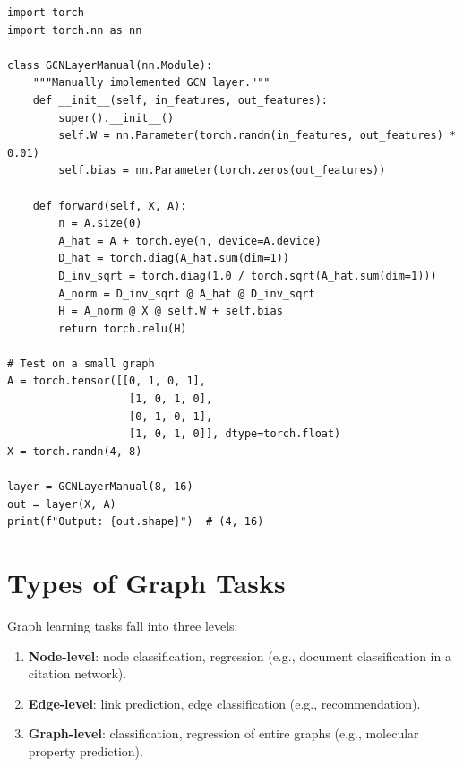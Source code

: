 \begin{codeblock}[title=\textbf{GCN implemented from scratch}]
\begin{verbatim}
import torch
import torch.nn as nn

class GCNLayerManual(nn.Module):
    """Manually implemented GCN layer."""
    def __init__(self, in_features, out_features):
        super().__init__()
        self.W = nn.Parameter(torch.randn(in_features, out_features) * 0.01)
        self.bias = nn.Parameter(torch.zeros(out_features))

    def forward(self, X, A):
        n = A.size(0)
        A_hat = A + torch.eye(n, device=A.device)
        D_hat = torch.diag(A_hat.sum(dim=1))
        D_inv_sqrt = torch.diag(1.0 / torch.sqrt(A_hat.sum(dim=1)))
        A_norm = D_inv_sqrt @ A_hat @ D_inv_sqrt
        H = A_norm @ X @ self.W + self.bias
        return torch.relu(H)

# Test on a small graph
A = torch.tensor([[0, 1, 0, 1],
                   [1, 0, 1, 0],
                   [0, 1, 0, 1],
                   [1, 0, 1, 0]], dtype=torch.float)
X = torch.randn(4, 8)

layer = GCNLayerManual(8, 16)
out = layer(X, A)
print(f"Output: {out.shape}")  # (4, 16)
\end{verbatim}
\end{codeblock}

\section{Types of Graph Tasks}

\begin{definition}
Graph learning tasks fall into three levels:
\begin{enumerate}
    \item \textbf{Node-level}: node classification, regression
          (e.g., document classification in a citation network).
    \item \textbf{Edge-level}: link prediction, edge classification
          (e.g., recommendation).
    \item \textbf{Graph-level}: classification, regression of entire graphs
          (e.g., molecular property prediction).
\end{enumerate}
\end{definition}

